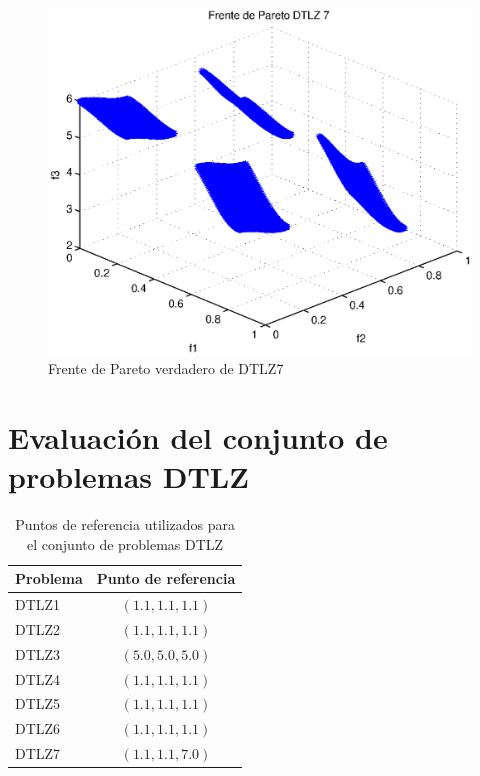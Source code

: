 \begin{figure}
 \centering
    \includegraphics[scale=0.7]{ApendiceA/paretoDTLZ7.eps}
    \caption{Frente de Pareto verdadero de DTLZ7}
    \label{fig:dtlz7}
\end{figure}

\section{Evaluaci\'on del conjunto de problemas DTLZ}

\begin{table}
  \begin{center}
    \begin{tabular}{|l||c|}
	\hline
	Problema  & Punto de referencia \\ 
	\hline
	\hline
	DTLZ1 & $(1.1,1.1,1.1)$ \\ 
	\hline
	DTLZ2 &  $(1.1,1.1,1.1)$\\
	\hline
	DTLZ3 &  $(5.0,5.0,5.0)$\\
	\hline
	DTLZ4 &  $(1.1,1.1,1.1)$\\
	\hline
	DTLZ5 &  $(1.1,1.1,1.1)$\\
	\hline
	DTLZ6 &  $(1.1,1.1,1.1)$\\
	\hline
	DTLZ7 &  $(1.1,1.1,7.0)$\\
	\hline
  \end{tabular}
  \caption{Puntos de referencia utilizados para el conjunto de problemas DTLZ}
  \label{tab:refdtlz}
\end{center}
\end{table}

